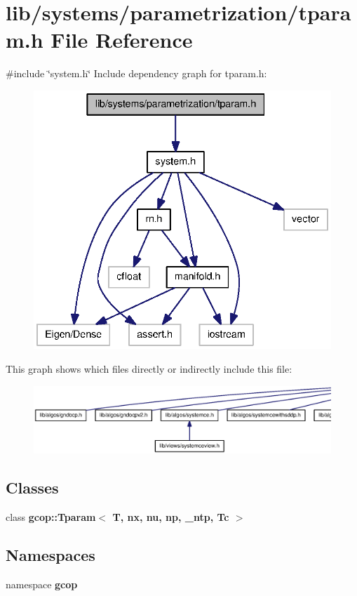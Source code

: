 \section{lib/systems/parametrization/tparam.h \-File \-Reference}
\label{tparam_8h}
{\ttfamily \#include \char`\"{}system.\-h\char`\"{}}\*
\-Include dependency graph for tparam.\-h\-:
\nopagebreak
\begin{figure}[H]
\begin{center}
\leavevmode
\includegraphics[width=336pt]{tparam_8h__incl}
\end{center}
\end{figure}
\-This graph shows which files directly or indirectly include this file\-:
\nopagebreak
\begin{figure}[H]
\begin{center}
\leavevmode
\includegraphics[width=350pt]{tparam_8h__dep__incl}
\end{center}
\end{figure}
\subsection*{\-Classes}
\begin{DoxyCompactItemize}
\item 
class {\bf gcop\-::\-Tparam$<$ T, nx, nu, np, \-\_\-ntp, Tc $>$}
\end{DoxyCompactItemize}
\subsection*{\-Namespaces}
\begin{DoxyCompactItemize}
\item 
namespace {\bf gcop}
\end{DoxyCompactItemize}
